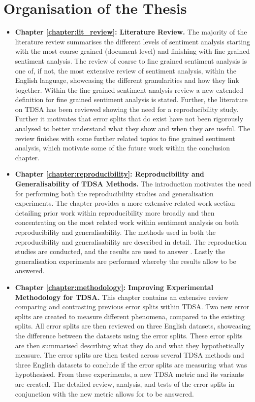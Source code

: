 \section{Organisation of the Thesis}
\begin{itemize}
    \item \textbf{Chapter \ref{chapter:lit_review}: Literature Review.}\newline
    The majority of the literature review summarises the different levels of sentiment analysis starting with the most coarse grained (document level) and finishing with fine grained sentiment analysis. The review of coarse to fine grained sentiment analysis is one of, if not, the most extensive review of sentiment analysis, within the English language, showcasing the different granularities and how they link together. Within the fine grained sentiment analysis review a new extended definition for fine grained sentiment analysis is stated. Further, the literature on TDSA has been reviewed showing the need for a reproducibility study. Further it motivates that error splits that do exist have not been rigorously analysed to better understand what they show and when they are useful. The review finishes with some further related topics to fine grained sentiment analysis, which motivate some of the future work within the conclusion chapter.
    \item \textbf{Chapter \ref{chapter:reproducibility}: Reproducibility and Generalisability of TDSA Methods.}\newline
    The introduction motivates the need for performing both the reproducibility studies and generalisation experiments. The chapter provides a more extensive related work section detailing prior work within reproducibility more broadly and then concentrating on the most related work within sentiment analysis on both reproducibility and generalisability. The methods used in both the reproducibility and generalisability are described in detail. The reproduction studies are conducted, and the results are used to answer . Lastly the generalisation experiments are performed whereby the results allow  to be answered.
    \item \textbf{Chapter \ref{chapter:methodology}: Improving Experimental Methodology for TDSA.}\newline
    This chapter contains an extensive review comparing and contrasting previous error splits within TDSA. Two new error splits are created to measure different phenomena, compared to the existing splits. All error splits are then reviewed on three English datasets, showcasing the difference between the datasets using the error splits. These error splits are then summarised describing what they do and what they hypothetically measure. The error splits are then tested across several TDSA methods and three English datasets to conclude if the error splits are measuring what was hypothesised. From these experiments, a new TDSA metric and its variants are created. The detailed review, analysis, and tests of the error splits in conjunction with the new metric allows for  to be answered.

\end{itemize}

